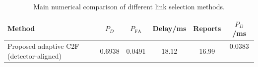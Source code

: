\begin{table}[t]
    \centering
    \caption{Main numerical comparison of different link selection methods.}
    \label{tab:main_summary}
    \begin{tabular}{l c c c c c}
        \hline
        Method & $P_D$ & $P_{\mathrm{FA}}$ & Delay/ms & Reports & $P_D$/ms \\
        \hline
        Proposed adaptive C2F (detector-aligned) & 0.6938 & 0.0491 & 18.12 & 16.99 & 0.0383 \
        \hline
    \end{tabular}
\end{table}
